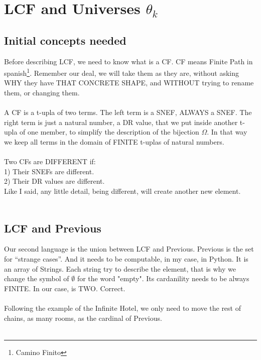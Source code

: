 \chapter{LCF and Universes $\theta_{k}$  }

	\section{Initial concepts needed}
		
		\noindent
		Before describing LCF, we need to know what is a CF. CF means Finite Path in spanish\footnote{Camino Finito}. Remember our deal, we will take them as they are, without asking WHY they have THAT CONCRETE SHAPE, and WITHOUT trying to rename them, or changing them.
		\\\\
		
		\noindent
		A CF is a t-upla of two terms. The left term is a SNEF, ALWAYS a SNEF. The right term is just a natural number, a DR value, that we put inside another t-upla of one member, to simplify the description of the bijection $\Omega$. In that way we keep all terms in the domain of FINITE t-uplas of natural numbers.
		\\\\
		
		\noindent
		Two CFs are DIFFERENT if:\\
		1) Their SNEFs are different.\\
		2) Their DR values are different.\\
		Like I said, any little detail, being different, will create another new element.
		\\\\
			
	\section{LCF and Previous}
	
		\noindent
		Our second language is the union between LCF and Previous. Previous is the set for ``strange cases''. And it needs to be computable, in my case, in Python. It is an array of Strings. Each string try to describe the element, that is why we change the symbol of $\emptyset$ for the word "empty". Its cardanility needs to be always FINITE. In our case, is TWO. Correct.
		\\\\
		
		\noindent
		Following the example of the Infinite Hotel, we only need to move the rest of chains, as many rooms, as the cardinal of Previous.
		\\\\
		
